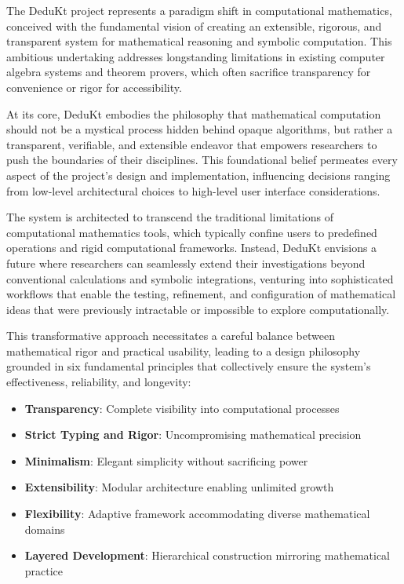 The DeduKt project represents a paradigm shift in computational mathematics, conceived with the fundamental vision of creating an extensible, rigorous, and transparent system for mathematical reasoning and symbolic computation.
This ambitious undertaking addresses longstanding limitations in existing computer algebra systems and theorem provers, which often sacrifice transparency for convenience or rigor for accessibility.

At its core, DeduKt embodies the philosophy that mathematical computation should not be a mystical process hidden behind opaque algorithms, but rather a transparent, verifiable, and extensible endeavor that empowers researchers to push the boundaries of their disciplines.
This foundational belief permeates every aspect of the project's design and implementation, influencing decisions ranging from low-level architectural choices to high-level user interface considerations.

The system is architected to transcend the traditional limitations of computational mathematics tools, which typically confine users to predefined operations and rigid computational frameworks.
Instead, DeduKt envisions a future where researchers can seamlessly extend their investigations beyond conventional calculations and symbolic integrations, venturing into sophisticated workflows that enable the testing, refinement, and configuration of mathematical ideas that were previously intractable or impossible to explore computationally.

This transformative approach necessitates a careful balance between mathematical rigor and practical usability, leading to a design philosophy grounded in six fundamental principles that collectively ensure the system's effectiveness, reliability, and longevity:

\begin{itemize}
    \item \textbf{Transparency}: Complete visibility into computational processes
    \item \textbf{Strict Typing and Rigor}: Uncompromising mathematical precision
    \item \textbf{Minimalism}: Elegant simplicity without sacrificing power
    \item \textbf{Extensibility}: Modular architecture enabling unlimited growth
    \item \textbf{Flexibility}: Adaptive framework accommodating diverse mathematical domains
    \item \textbf{Layered Development}: Hierarchical construction mirroring mathematical practice
\end{itemize}

